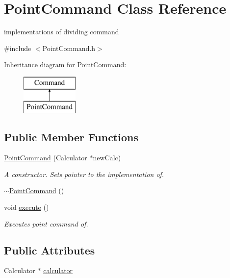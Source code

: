 \hypertarget{class_point_command}{}\section{Point\+Command Class Reference}
\label{class_point_command}


implementations of dividing command  




{\ttfamily \#include $<$Point\+Command.\+h$>$}

Inheritance diagram for Point\+Command\+:\begin{figure}[H]
\begin{center}
\leavevmode
\includegraphics[height=2.000000cm]{class_point_command}
\end{center}
\end{figure}
\subsection*{Public Member Functions}
\begin{DoxyCompactItemize}
\item 
\hyperlink{class_point_command_acc022d8812e9d289bf723dd900a338bb}{Point\+Command} (Calculator $\ast$new\+Calc)
\begin{DoxyCompactList}\small\item\em A constructor. Sets pointer to the implementation of. \end{DoxyCompactList}\item 
\hyperlink{class_point_command_a9662dfccb0f7c3873545edb2a32a749b}{$\sim$\+Point\+Command} ()
\item 
void \hyperlink{class_point_command_a681f8465afa18959cd268fab140d9f69}{execute} ()
\begin{DoxyCompactList}\small\item\em Executes point command of. \end{DoxyCompactList}\end{DoxyCompactItemize}
\subsection*{Public Attributes}
\begin{DoxyCompactItemize}
\item 
Calculator $\ast$ \hyperlink{class_point_command_a63132439ae2e59216eddddd4754f9109}{calculator}
\end{DoxyCompactItemize}


